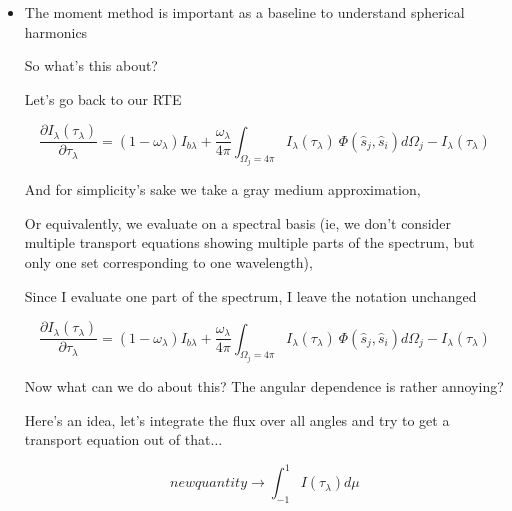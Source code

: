 \documentclass[12pt]{article}
\renewcommand{\_}{\kern-1.5pt\textunderscore\kern-1.5pt}
\begin{document}
\begin{itemize}
	\item The moment method is important as a baseline to understand spherical harmonics\par

So what’s this about?\par

Let’s go back to our RTE\par

 \[ \frac{ \partial I_{ \lambda } \left(  \tau_{ \lambda } \right) }{ \partial  \tau_{ \lambda }}= \left( 1- \omega _{ \lambda } \right)  I_{b \lambda }+\frac{ \omega _{ \lambda }}{4 \pi } \int _{ \Omega _{j}=4 \pi }^{}I_{ \lambda } \left(  \tau_{ \lambda } \right) ~ \Phi  \left( \hat{s}_{j},\hat{s}_{i} \right) d \Omega _{j}-I_{ \lambda } \left(  \tau_{ \lambda } \right)  \] \par

And for simplicity’s sake we take a gray medium approximation,\par

Or equivalently, we evaluate on a spectral basis (ie, we don’t consider multiple transport equations showing multiple parts of the spectrum, but only one set corresponding to one wavelength), \par

Since I evaluate one part of the spectrum, I leave the notation unchanged \par


\vspace{\baselineskip}
 \[ \frac{ \partial I_{ \lambda } \left(  \tau_{ \lambda } \right) }{ \partial  \tau_{ \lambda }}= \left( 1- \omega _{ \lambda } \right)  I_{b \lambda }+\frac{ \omega _{ \lambda }}{4 \pi } \int _{ \Omega _{j}=4 \pi }^{}I_{ \lambda } \left(  \tau_{ \lambda } \right) ~ \Phi  \left( \hat{s}_{j},\hat{s}_{i} \right) d \Omega _{j}-I_{ \lambda } \left(  \tau_{ \lambda } \right)  \] \par

Now what can we do about this? The angular dependence is rather annoying?\par


\vspace{\baselineskip}
Here’s an idea, let’s integrate the flux over all angles and try to get a transport equation out of that$ \ldots $ \par

 \[ new quantity \rightarrow  \int _{-1}^{1}I \left(  \tau_{ \lambda } \right)  d \mu  \] \par


\end{itemize}
\end{document}
